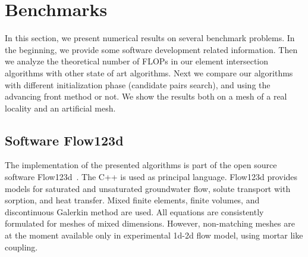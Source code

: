 % 





\section{Benchmarks}
\label{sec:benchmarks}

In this section, we present numerical results on several benchmark problems. 
In the beginning, we provide some software development related information.
Then we analyze the theoretical number of FLOPs in our element intersection algorithms with 
other state of art algorithms.
Next we compare our algorithms with different initialization phase (candidate pairs search),
and using the advancing front method or not. We show the results both on a mesh of a real locality
and an artificial mesh.


\subsection{Software Flow123d}
The implementation of the presented algorithms is part of the open source software Flow123d~\cite{flow123d}.
The C++ is used as principal language. Flow123d provides models for saturated and unsaturated groundwater flow,
solute transport with sorption, and  heat transfer. Mixed finite elements, finite volumes, and discontinuous Galerkin method are 
used. All equations are consistently formulated for meshes of mixed dimensions.  However,
non-matching meshes are at the moment available only in experimental 1d-2d flow model, using mortar like coupling.

